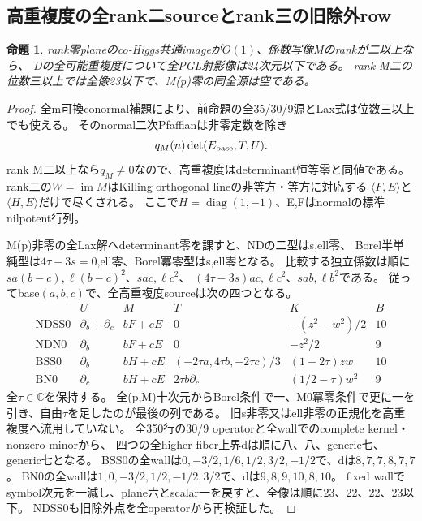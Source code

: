 \documentclass[a4paper,11pt]{ltjsarticle}
\newtheorem{proposition}{命題}[section]
\theoremstyle{definition}
\begin{document}
\subsection{高重複度の全rank二sourceとrank三の旧除外row}
\begin{proposition}\label{prop:plane-zero-all-m-k1-rank-atleast-two-G}
rank零planeのco-Higgs共通imageが$O(1)$、係数写像Mのrankが二以上なら、
Dの全可能重複度について全PGL射影像は24次元以下である。
rank M二の位数三以上では全像23以下で、M(p)零の同全源は空である。
\end{proposition}
\begin{proof}
全m可換conormal補題により、前命題の全35/30/9源とLax式は位数三以上でも使える。
そのnormal二次Pfaffianは非零定数を除き
\[
 q_M(n)\det(E_{\rm base},T,U).
\]
rank M二以上なら$q_M\ne0$なので、高重複度はdeterminant恒等零と同値である。
rank二の$W=\operatorname{im}M$はKilling orthogonal lineの非等方・等方に対応する
$\langle F,E\rangle$と$\langle H,E\rangle$だけで尽くされる。
ここで$H=\operatorname{diag}(1,-1)$、E,Fはnormalの標準nilpotent行列。

M(p)非零の全Lax解へdeterminant零を課すと、NDの二型はs,ell零、
Borel半単純型は$4\tau-3s=0$,ell零、Borel冪零型はs,ell零となる。
比較する独立係数は順に$sa(b-c),\ell(b-c)^2$、$sac,\ell c^2$、
$(4\tau-3s)ac,\ell c^2$、$sab,\ell b^2$である。
従ってbase$(a,b,c)$で、全高重複度sourceは次の四つとなる。
\[
\begin{array}{c|c|c|c|c|c}
 &U&M&T&K&B\\\hline
 \mathrm{NDSS0}&\partial_b+\partial_c&bF+cE&0&-(z^2-w^2)/2&10\\
 \mathrm{NDN0}&\partial_b&bF+cE&0&-z^2/2&9\\
 \mathrm{BSS0}&\partial_b&bH+cE&(-2\tau a,4\tau b,-2\tau c)/3&(1-2\tau)zw&10\\
 \mathrm{BN0}&\partial_c&bH+cE&2\tau b\partial_c&(1/2-\tau)w^2&9
\end{array}
\]
全$\tau\in\mathbb C$を保持する。
全(p,M)十次元からBorel条件で一、M0冪零条件で更に一を引き、自由$\tau$を足したのが最後の列である。
旧s非零又はell非零の正規化を高重複度へ流用していない。
全350行の30/9 operatorと全wallでのcomplete kernel・nonzero minorから、
四つの全higher fiber上界dは順に八、八、generic七、generic七となる。
BSS0の全wallは$0,-3/2,1/6,1/2,3/2,-1/2$で、dは$8,7,7,8,7,7$。
BN0の全wallは$1,0,-3/2,1/2,-1/2,3/2$で、dは$9,8,9,10,8,10$。
fixed wallでsymbol次元を一減し、plane六とscalar一を戻すと、全像は順に23、22、22、23以下。
NDSS0も旧除外点を全operatorから再検証した。


\end{proof}
\end{document}
